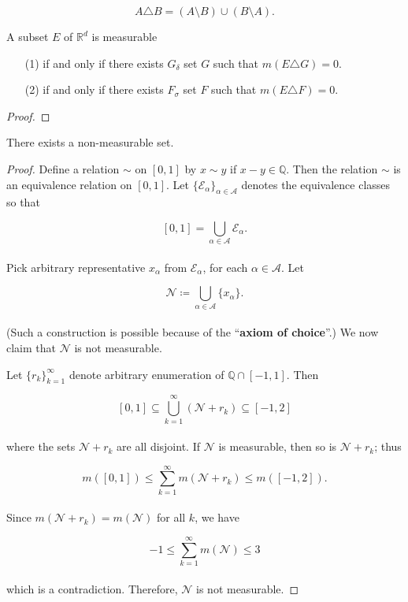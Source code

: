 \documentclass[12pt, a4paper, openany, twoside]{book}
\theoremstyle{definition}
\theoremstyle{remark}
\newcommand{\BQ}{{\mathbb {Q}}} \newcommand{\BR}{{\mathbb {R}}}
\theoremstyle{plain}
\numberwithin{equation}{section}
\begin{document}
\[A\triangle B=(A\setminus B)\cup (B\setminus A).\]
\[\]
\begin{tcolorbox}[colback=yellow!10!white,colframe=red!75!black,title=Theorem 1.3.7]\label{Theorem 1.3.7}
    A subset $E$ of $\BR^d$ is measurable 
    \begin{enumerate}
        \item [(1)] if and only if there exists $G_\delta$ set $G$ such that $m(E\triangle G)=0$.
        \item [(2)] if and only if there exists $F_\sigma$ set $F$ such that $m(E\triangle F)=0$.
    \end{enumerate}
\end{tcolorbox}
\begin{proof}
    
\end{proof}
\vspace{5mm}
\begin{tcolorbox}[colback=yellow!10!white,colframe=red!75!black,title=Theorem 1.3.8]\label{Theorem 1.3.8}
    There exists a non-measurable set.
\end{tcolorbox}
\begin{proof}
    Define a relation $\sim$ on $[0,1]$ by $x\sim y$ if $x-y\in\BQ$. Then the relation $\sim$ is an equivalence relation on $[0,1]$. Let $\{\mathcal{E}_\alpha\}_{\alpha\in\mathcal{A}}$ denotes the equivalence classes so that

    \[[0,1]=\bigcup_{\alpha\in\mathcal{A}}{\mathcal{E}_\alpha}.\]
    \\
    Pick arbitrary representative $x_\alpha$ from $\mathcal{E}_\alpha$, for each $\alpha\in\mathcal{A}$. Let 

    \[\mathcal{N}\coloneqq\bigcup_{\alpha\in\mathcal{A}}{\{x_\alpha\}}.\]
    \\
    (Such a construction is possible because of the ``\textbf{axiom of choice}''.) We now claim that $\mathcal{N}$ is not measurable.

    Let $\{r_k\}_{k=1}^{\infty}$ denote arbitrary enumeration of $\BQ\cap [-1,1]$. Then 
    
    \[[0,1]\subseteq \bigcup_{k=1}^{\infty}{(\mathcal{N}+r_k)}\subseteq [-1,2]\]
    \\
    where the sets $\mathcal{N}+r_k$ are all disjoint. If $\mathcal{N}$ is measurable, then so is $\mathcal{N}+r_k$; thus

    \[m([0,1])\leq \sum_{k=1}^{\infty}{m(\mathcal{N}+r_k)}\leq m([-1,2]).\]
    \\
    Since $m(\mathcal{N}+r_k)=m(\mathcal{N})$ for all $k$, we have 

    \[-1\leq \sum_{k=1}^{\infty}{m(\mathcal{N})}\leq 3\]
    \\
    which is a contradiction. Therefore, $\mathcal{N}$ is not measurable.
\end{proof}
\vspace{5mm}
\end{document}
